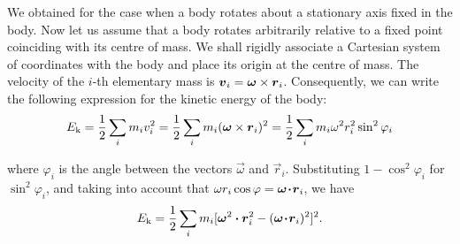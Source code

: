 \begin{table}[!b]
	\renewcommand{\arraystretch}{1.2}
	\caption{}
	\vspace{-0.6cm}
	\label{table:5_1}
	\begin{center}\end{center}
\end{table}

We obtained  for the case when a body rotates about a stationary axis fixed in the body. Now let us assume that a body rotates arbitrarily relative to a fixed point coinciding with its centre of mass. We shall rigidly associate a Cartesian system of coordinates with the body and place its origin at the centre of mass. The velocity of the $i$-th elementary mass is $\boldsymbol{v}_i=\boldsymbol{\omega}\times\boldsymbol{r}_i$. Consequently, we can write the following expression for the kinetic energy of the body:
\begin{equation*}
	E_{\text{k}} = \frac{1}{2}\sum_i m_iv_i^2 = \frac{1}{2}\sum_i m_i (\boldsymbol{\omega}\times\boldsymbol{r}_i)^2 = \frac{1}{2}\sum_i m_i \omega^2 r_i^2\sin^2\varphi_i
\end{equation*}

\noindent
where $\varphi_i$ is the angle between the vectors $\vec{\omega}$ and $\vec{r}_i$. Substituting $1-\cos^2\varphi_i$ for $\sin^2\varphi_i$, and taking into account that $\omega r_i\cos\varphi=\boldsymbol{\omega\!\cdot\!r}_i$, we have
\begin{equation*}
	E_{\text{k}} = \frac{1}{2}\sum_i m_i [\boldsymbol{\omega}^2\boldsymbol{\cdot}\boldsymbol{r}_i^2 - (\boldsymbol{\omega\!\cdot\!r}_i)^2]^2.
\end{equation*}

